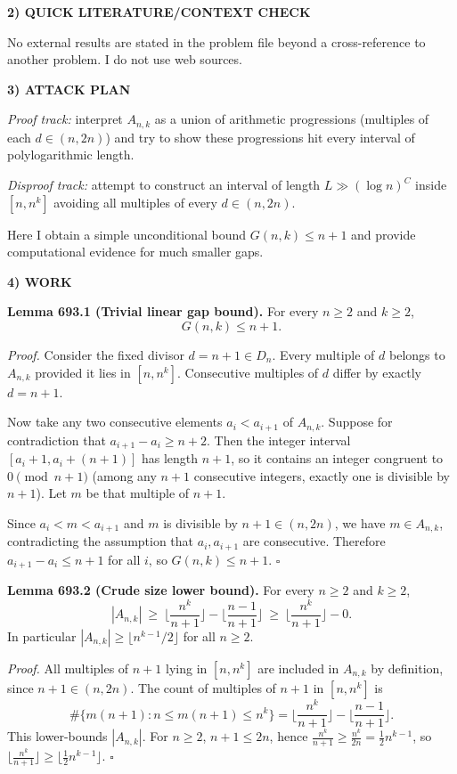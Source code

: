 \bigskip
\noindent\textbf{2) QUICK LITERATURE/CONTEXT CHECK}

No external results are stated in the problem file beyond a cross-reference to another problem. I do not use web sources.

\bigskip
\noindent\textbf{3) ATTACK PLAN}

\emph{Proof track:} interpret $A_{n,k}$ as a union of arithmetic progressions (multiples of each $d\in(n,2n)$) and try to show these progressions hit every interval of polylogarithmic length.

\emph{Disproof track:} attempt to construct an interval of length $L\gg (\log n)^C$ inside $[n,n^k]$ avoiding all multiples of every $d\in(n,2n)$.

Here I obtain a simple unconditional bound $G(n,k)\le n+1$ and provide computational evidence for much smaller gaps.

\bigskip
\noindent\textbf{4) WORK}

\noindent\textbf{Lemma 693.1 (Trivial linear gap bound).}
For every $n\ge 2$ and $k\ge 2$,
\[
G(n,k)\le n+1.
\]

\smallskip
\noindent\emph{Proof.}
Consider the fixed divisor $d=n+1\in D_n$. Every multiple of $d$ belongs to $A_{n,k}$ provided it lies in $[n,n^k]$. Consecutive multiples of $d$ differ by exactly $d=n+1$.

Now take any two consecutive elements $a_i<a_{i+1}$ of $A_{n,k}$. Suppose for contradiction that $a_{i+1}-a_i\ge n+2$. Then the integer interval $[a_i+1,a_i+(n+1)]$ has length $n+1$, so it contains an integer congruent to $0\pmod{n+1}$ (among any $n+1$ consecutive integers, exactly one is divisible by $n+1$). Let $m$ be that multiple of $n+1$.

Since $a_i<m<a_{i+1}$ and $m$ is divisible by $n+1\in(n,2n)$, we have $m\in A_{n,k}$, contradicting the assumption that $a_i,a_{i+1}$ are consecutive. Therefore $a_{i+1}-a_i\le n+1$ for all $i$, so $G(n,k)\le n+1$. \hfill$\square$

\medskip
\noindent\textbf{Lemma 693.2 (Crude size lower bound).}
For every $n\ge 2$ and $k\ge 2$,
\[
|A_{n,k}|\ \ge\ \Big\lfloor\frac{n^k}{n+1}\Big\rfloor-\Big\lfloor\frac{n-1}{n+1}\Big\rfloor\ \ge\ \Big\lfloor\frac{n^k}{n+1}\Big\rfloor-0.
\]
In particular $|A_{n,k}|\ge \lfloor n^{k-1}/2\rfloor$ for all $n\ge 2$.

\smallskip
\noindent\emph{Proof.}
All multiples of $n+1$ lying in $[n,n^k]$ are included in $A_{n,k}$ by definition, since $n+1\in(n,2n)$. The count of multiples of $n+1$ in $[n,n^k]$ is
\[
\#\{m(n+1): n\le m(n+1)\le n^k\}=\Big\lfloor\frac{n^k}{n+1}\Big\rfloor-\Big\lfloor\frac{n-1}{n+1}\Big\rfloor.
\]
This lower-bounds $|A_{n,k}|$. For $n\ge 2$, $n+1\le 2n$, hence $\frac{n^k}{n+1}\ge \frac{n^k}{2n}=\frac{1}{2}n^{k-1}$, so $\lfloor\frac{n^k}{n+1}\rfloor\ge \lfloor\frac{1}{2}n^{k-1}\rfloor$. \hfill$\square$

